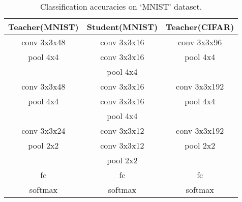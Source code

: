 \documentclass[journal]{IEEEtran}
\begin{document}
\iffalse
\begin{table}[htb]
\renewcommand\arraystretch{1}
\centering
\small
\setlength{\abovecaptionskip}{0.2cm}
\setlength{\belowcaptionskip}{0.2cm}
\caption{Classification accuracies on `MNIST' dataset.}
\begin{tabular}{|c|c|c|}
\hline
Teacher(MNIST)  &  Student(MNIST)  &  Teacher(CIFAR)  \\
\hline
\hline
conv 3x3x48  &  conv 3x3x16  &  conv 3x3x96  \\
pool 4x4     &  conv 3x3x16  &  pool 4x4     \\
           &  pool 4x4     &               \\
\hline
conv 3x3x48  &  conv 3x3x16  &  conv 3x3x192 \\
pool 4x4     &  conv 3x3x16  &  pool 4x4     \\
           &  pool 4x4     &               \\
\hline
conv 3x3x24  &  conv 3x3x12  &  conv 3x3x192 \\
pool 2x2     &  conv 3x3x12  &  pool 2x2     \\
           &  pool 2x2     &               \\
\hline
fc  &  fc  &  fc  \\
softmax  &  softmax  &  softmax  \\
\hline
\end{tabular}
\label{tab_arch_3}
\end{table}
\end{document}
